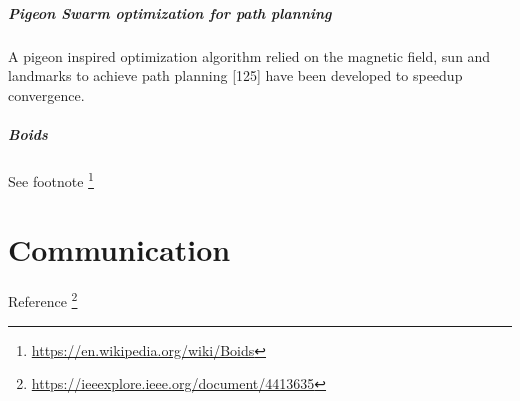 \documentclass{article}
\begin{document}
			\subparagraph{Pigeon Swarm optimization for path planning}
				A pigeon inspired optimization algorithm relied on the magnetic field, sun and landmarks to achieve path planning \cite{rizk-2018-decision-making-in-multiagent-systems-a-survey}[125] have
				been developed to speedup convergence.
			\subparagraph{Boids}
				See footnote \footnote{\url{https://en.wikipedia.org/wiki/Boids}}
	\section{Communication}
		Reference \footnote{\url{https://ieeexplore.ieee.org/document/4413635}}
	
\end{document}
